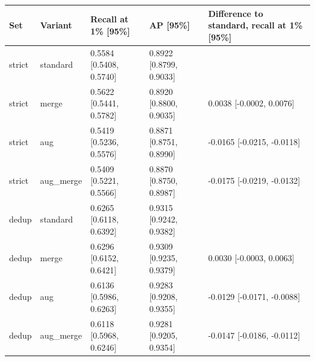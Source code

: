 \begin{tabular}{lllll}
\toprule
Set & Variant & Recall at 1\% [95\%] & AP [95\%] & Difference to standard, recall at 1\% [95\%] \\
\midrule
strict & standard & 0.5584 [0.5408, 0.5740] & 0.8922 [0.8799, 0.9033] &  \\
strict & merge & 0.5622 [0.5441, 0.5782] & 0.8920 [0.8800, 0.9035] & 0.0038 [-0.0002, 0.0076] \\
strict & aug & 0.5419 [0.5236, 0.5576] & 0.8871 [0.8751, 0.8990] & -0.0165 [-0.0215, -0.0118] \\
strict & aug\_merge & 0.5409 [0.5221, 0.5566] & 0.8870 [0.8750, 0.8987] & -0.0175 [-0.0219, -0.0132] \\
dedup & standard & 0.6265 [0.6118, 0.6392] & 0.9315 [0.9242, 0.9382] &  \\
dedup & merge & 0.6296 [0.6152, 0.6421] & 0.9309 [0.9235, 0.9379] & 0.0030 [-0.0003, 0.0063] \\
dedup & aug & 0.6136 [0.5986, 0.6263] & 0.9283 [0.9208, 0.9355] & -0.0129 [-0.0171, -0.0088] \\
dedup & aug\_merge & 0.6118 [0.5968, 0.6246] & 0.9281 [0.9205, 0.9354] & -0.0147 [-0.0186, -0.0112] \\
\bottomrule
\end{tabular}

